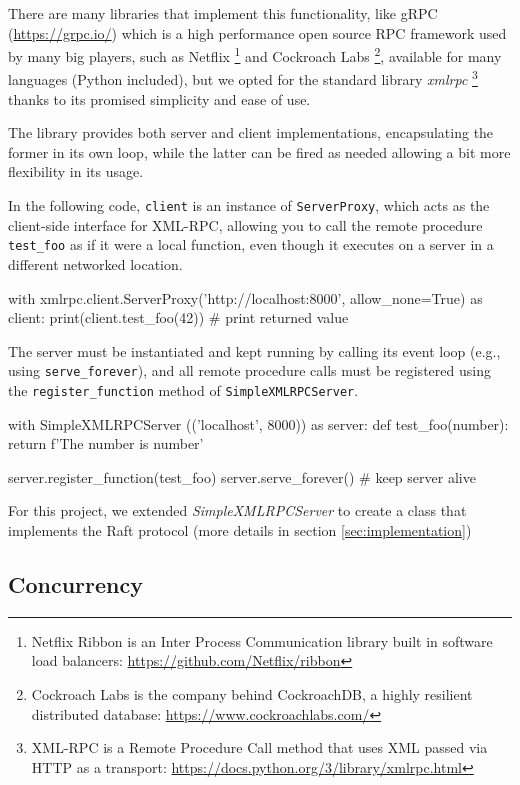 There are many libraries that implement this functionality, like gRPC (\url{https://grpc.io/}) which is a high performance open source RPC framework used by many big players, such as Netflix \footnote{Netflix Ribbon is an Inter Process Communication library built in software load balancers: \url{https://github.com/Netflix/ribbon}} and Cockroach Labs \footnote{Cockroach Labs is the company behind CockroachDB, a highly resilient distributed database: \url{https://www.cockroachlabs.com/}}, available for many languages (Python included), but we opted for the standard library \textit{xmlrpc} \footnote{XML-RPC is a Remote Procedure Call method that uses XML passed via HTTP as a transport: \url{https://docs.python.org/3/library/xmlrpc.html}} thanks to its promised simplicity and ease of use. 

The library provides both server and client implementations, encapsulating the former in its own loop, while the latter can be fired as needed allowing a bit more flexibility in its usage.

In the following code, \verb|client| is an instance of \verb|ServerProxy|, which acts as the client-side interface for XML-RPC, allowing you to call the remote procedure \verb|test_foo| as if it were a local function, even though it executes on a server in a different networked location.

\begin{python}
with xmlrpc.client.ServerProxy('http://localhost:8000', allow_none=True) as client:
    print(client.test_foo(42)) # print returned value
\end{python}

The server must be instantiated and kept running by calling its event loop (e.g., using \verb|serve_forever|), and all remote procedure calls must be registered using the \verb|register_function| method of \verb|SimpleXMLRPCServer|.

\begin{python}
with SimpleXMLRPCServer (('localhost', 8000)) as server:
    def test_foo(number):
        return f'The number is {number}'

    server.register_function(test_foo)  
    server.serve_forever() # keep server alive
\end{python}

For this project, we extended \textit{SimpleXMLRPCServer} to create a class that implements the Raft protocol (more details in section \ref{sec:implementation})

\subsection{Concurrency} \label{sec:threading}


